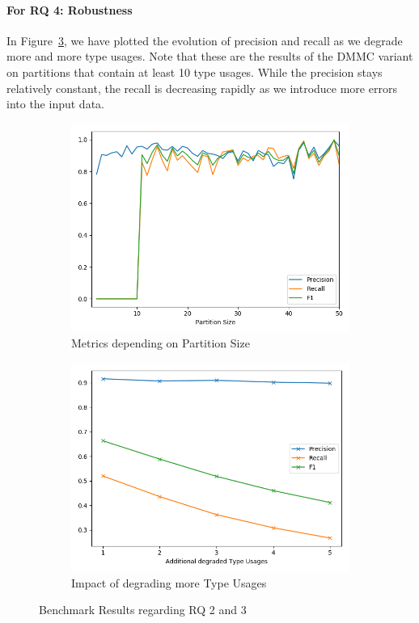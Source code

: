 \paragraph{For RQ 4: Robustness}

In Figure~\ref{fig:robustness}, we have plotted the evolution of precision and recall as we degrade more and more type usages.
Note that these are the results of the $\text{DMMC}$ variant on partitions that contain at least 10 type usages.
While the precision stays relatively constant, the recall is decreasing rapidly as we introduce more errors into the input data.

\begin{figure}[t]
    \centering
    \begin{subfigure}[h]{0.49\textwidth}
        \centering
        \includegraphics[width=\textwidth]{figures/graph_partition}
        \caption{Metrics depending on Partition Size}\label{fig:partition}
    \end{subfigure}
    \begin{subfigure}[h]{0.49\textwidth}
        \centering
        \includegraphics[width=\textwidth]{figures/graph_robustness}
        \caption{Impact of degrading more Type Usages}\label{fig:robustness}
    \end{subfigure}
    \caption{Benchmark Results regarding RQ 2 and 3}
\end{figure}

